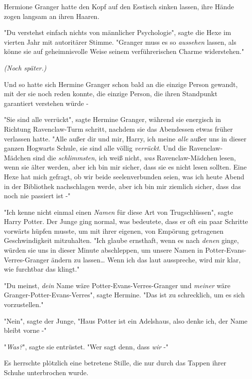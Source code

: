 {Hermione Granger hatte den Kopf auf den Esstisch sinken lassen, ihre Hände zogen langsam an ihren Haaren.

"Du verstehst einfach nichts von männlicher Psychologie", sagte die Hexe im vierten Jahr mit autoritärer Stimme. "Granger muss es so \emph{aussehen} lassen, als könne sie auf geheimnisvolle Weise seinem verführerischen Charme widerstehen."

\emph{\emph{(Noch} \emph{später.)}}

Und so hatte sich Hermine Granger schon bald an die einzige Person gewandt, mit der sie noch reden konnte, die einzige Person, die ihren Standpunkt garantiert verstehen würde -

"Sie sind alle verrückt", sagte Hermine Granger, während sie energisch in Richtung Ravenclaw-Turm schritt, nachdem sie das Abendessen etwas früher verlassen hatte. "Alle außer dir und mir, Harry, ich meine \emph{alle} außer uns in dieser ganzen Hogwarts Schule, sie sind alle völlig \emph{verrückt}. Und die Ravenclaw-Mädchen sind die \emph{schlimmsten}, ich weiß nicht, \emph{was} Ravenclaw-Mädchen lesen, wenn sie älter werden, aber ich bin mir sicher, dass sie es nicht lesen sollten. Eine Hexe hat mich gefragt, ob wir beide seelenverbunden seien, was ich heute Abend in der Bibliothek nachschlagen werde, aber ich bin mir ziemlich sicher, dass das noch nie passiert ist -"

"Ich kenne nicht einmal einen \emph{Namen} für diese Art von Trugschlüssen", sagte Harry Potter. Der Junge ging normal, was bedeutete, dass er oft ein paar Schritte vorwärts hüpfen musste, um mit ihrer eigenen, von Empörung getragenen Geschwindigkeit mitzuhalten. "Ich glaube ernsthaft, wenn es nach \emph{denen} ginge, würden sie uns in dieser Minute abschleppen, um unsere Namen in Potter-Evans-Verres-Granger ändern zu lassen… Wenn ich das laut ausspreche, wird mir klar, wie furchtbar das klingt."

"Du meinst, \emph{dein} Name wäre Potter-Evans-Verres-Granger und \emph{meiner} wäre Granger-Potter-Evans-Verres", sagte Hermine. "Das ist zu schrecklich, um es sich vorzustellen."

"Nein", sagte der Junge, "Haus Potter ist ein Adelshaus, also denke ich, der Name bleibt vorne -"

"\emph{Was?}", sagte sie entrüstet. "Wer sagt denn, dass \emph{wir} -"

Es herrschte plötzlich eine betretene Stille, die nur durch das Tappen ihrer Schuhe unterbrochen wurde.

}
